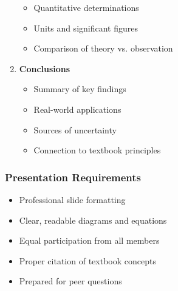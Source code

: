 \documentclass[12pt]{article}
\begin{document}
\begin{enumerate}[label=\textbf{Slide \arabic*.}]
\begin{itemize}
\item Quantitative determinations
\item Units and significant figures
\item Comparison of theory vs. observation
\end{itemize}
\item \textbf{Conclusions}
\begin{itemize}
\item Summary of key findings
\item Real-world applications
\item Sources of uncertainty
\item Connection to textbook principles
\end{itemize}
\end{enumerate}
\subsubsection{Presentation Requirements}
\begin{itemize}
\item Professional slide formatting
\item Clear, readable diagrams and equations
\item Equal participation from all members
\item Proper citation of textbook concepts
\item Prepared for peer questions
\end{itemize}
\end{document}

